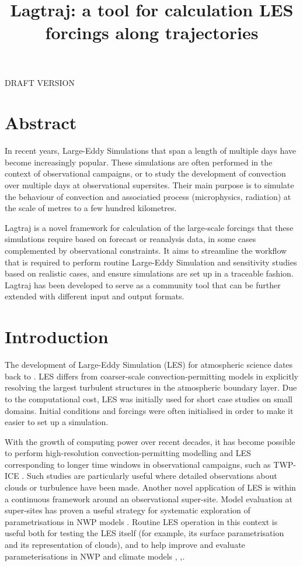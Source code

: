 \documentclass[a4paper,11pt]{article}
\title{Lagtraj: a tool for calculation LES forcings along trajectories}
\begin{document}
\maketitle

DRAFT VERSION

\section*{Abstract}

In recent years, Large-Eddy Simulations that span a length of
multiple days have become increasingly popular. These simulations are
often performed in the context of observational campaigns, or to study
the development of convection over multiple days at observational
supersites. Their main purpose is to simulate the behaviour of
convection and associatied process (microphysics, radiation) at the
scale of metres to a few hundred kilometres.

Lagtraj is a novel framework for calculation of the large-scale
forcings that these simulations require based on forecast or reanalysis
data, in some cases complemented by observational constraints. It aims
to streamline the workflow that is required to perform routine
Large-Eddy Simulation and sensitivity studies based on realistic cases,
and ensure simulations are set up in a traceable fashion. Lagtraj has
been developed to serve as a community tool that can be further
extended with different input and output formats.

\section{Introduction}

The development of Large-Eddy Simulation (LES) for atmospheric science
dates back to \cite{deardorff1970}. LES differs from coarser-scale
convection-permitting models in explicitly resolving the largest
turbulent structures in the atmospheric boundary layer. Due to the
computational cost, LES was initially used for short case studies on
small domains. Initial conditions and forcings were often initialised
in order to make it easier to set up a simulation.

With the growth of computing power over recent decades, it has become
possible to perform high-resolution convection-permitting
modelling and LES corresponding to longer time windows in observational
campaigns, such as TWP-ICE \citep{fridlind2012}. Such studies are
particularly useful where detailed observations about clouds or
turbulence have been made. Another novel application of LES is within a
continuous framework around an observational super-site. Model
evaluation at super-sites has proven a useful strategy for systematic
exploration of parametrisations in NWP models \cite{neggers2012}.
Routine LES operation in this context is useful both for testing the
LES itself (for example, its surface parametrisation and its
representation of clouds), and to help improve and evaluate
parameterisations in NWP and climate models \cite{schalkwijk2015},
\cite{laar2019},\cite{gustafson2020}.
\end{document}
